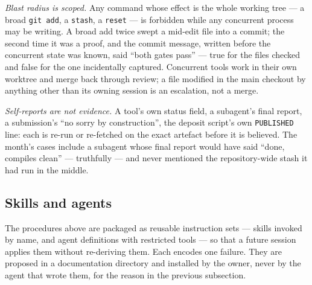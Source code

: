 \documentclass[11pt]{article}
\begin{document}
\emph{Blast radius is scoped.} Any command whose effect is the whole working tree --- a broad
\texttt{git add}, a \texttt{stash}, a \texttt{reset} --- is forbidden while any concurrent
process may be writing. A broad add twice swept a mid-edit file into a commit; the second time
it was a proof, and the commit message, written before the concurrent state was known, said
``both gates pass'' --- true for the files checked and false for the one incidentally captured. Concurrent tools work in their own
worktree and merge back through review; a file modified in the main checkout by anything other
than its owning session is an escalation, not a merge.

\emph{Self-reports are not evidence.} A tool's own status field, a subagent's final report, a
submission's ``no sorry by construction'', the deposit script's own \texttt{PUBLISHED} line: each
is re-run or re-fetched on the exact artefact before it is believed. The month's cases include a
subagent whose final report would have said ``done, compiles clean'' --- truthfully --- and never
mentioned the repository-wide stash it had run in the middle.

\subsection{Skills and agents}

The procedures above are packaged as reusable instruction sets --- skills invoked by name, and
agent definitions with restricted tools --- so that a future session applies them without
re-deriving them. Each encodes one failure. They are proposed in a documentation directory and
installed by the owner, never by the agent that wrote them, for the reason in the previous
subsection.
\end{document}
